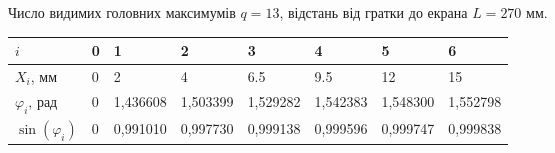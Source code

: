 \documentclass[12pt,a4paper]{article}
\begin{document}
    Число видимих головних максимумів $q = 13$, відстань від гратки до екрана $L = 270$ мм.

    \begin{table}[ht]
        \begin{tabular}{|l|*{7}{l}|}
        \hline
        $i$
            & 0 & 1 & 2 & 3 & 4 & 5 & 6 \\
        \hline
        $X_i$, мм
            & 0 & 2 & 4 & 6.5 & 9.5 & 12 & 15 \\
        $\varphi_i$, рад
        & 0 & 1,436608 & 1,503399 & 1,529282 & 1,542383 & 1,548300
        & 1,552798 \\
        $\sin(\varphi_i)$
        & 0 & 0,991010 & 0,997730 & 0,999138 & 0,999596 & 0,999747 & 0,999838 \\
        \hline
        \end{tabular}
    \end{table}
\end{document}

